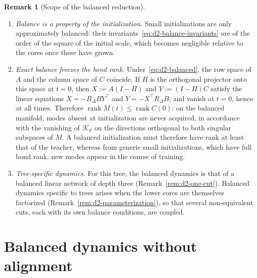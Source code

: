 \documentclass[11pt]{article}
\newcommand{\rank}{\operatorname{rank}}
\theoremstyle{definition}
\newtheorem{remark}[theorem]{Remark}
\numberwithin{equation}{section}
\begin{document}
\begin{remark}[Scope of the balanced reduction]\label{rem:d2-balanced-scope}
\leavevmode
\begin{enumerate}[label=(\roman*),nosep]
\item \emph{Balance is a property of the initialization.} Small initializations are only approximately balanced: their invariants~\eqref{eq:d2-balance-invariants} are of the order of the square of the initial scale, which becomes negligible relative to the cores once these have grown.
\item \emph{Exact balance freezes the bond rank.} Under~\eqref{eq:d2-balanced}, the row space of $A$ and the column space of $C$ coincide. If $\Pi$ is the orthogonal projector onto this space at $t=0$, then $X:=A(I-\Pi)$ and $Y:=(I-\Pi)C$ satisfy the linear equations $\dot X=-R_\Delta BY^\top$ and $\dot Y=-X^\top R_\Delta B$, and vanish at $t=0$, hence at all times. Therefore $\rank M(t)\le\rank C(0)$: on the balanced manifold, modes absent at initialization are never acquired, in accordance with the vanishing of $\mathcal K_\vartheta$ on the directions orthogonal to both singular subspaces of $M$. A balanced initialization must therefore have rank at least that of the teacher, whereas from generic small initializations, which have full bond rank, new modes appear in the course of training.
\item \emph{Tree-specific dynamics.} For this tree, the balanced dynamics is that of a balanced linear network of depth three (Remark~\ref{rem:d2-one-cut}). Balanced dynamics specific to trees arises when the lower cores are themselves factorized (Remark~\ref{rem:d2-parameterization}), so that several non-equivalent cuts, each with its own balance conditions, are coupled.
\end{enumerate}
\end{remark}

\section{Balanced dynamics without alignment}\label{sec:nonaligned}
\end{document}
